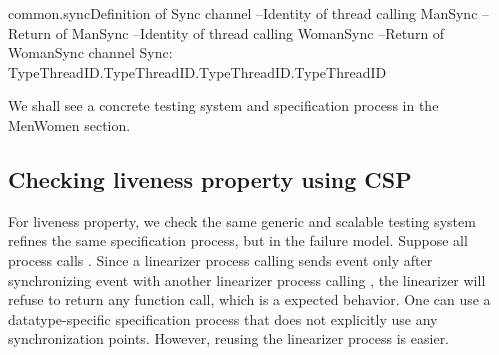 \documentclass{article}
\begin{document}
\begin{cspinline}{common.sync}{Definition of Sync channel}
--Identity of thread calling ManSync
--Return of ManSync
--Identity of thread calling WomanSync
--Return of WomanSync
channel Sync: TypeThreadID.TypeThreadID.TypeThreadID.TypeThreadID
\end{cspinline}
  
We shall see a concrete testing system and specification process in the MenWomen section. 

\subsection{Checking liveness property using CSP}
For liveness property, we check the same generic and scalable testing system refines the same specification process, but in the failure model. Suppose all process calls . Since a linearizer process calling  sends  event only after synchronizing  event with another linearizer process calling , the linearizer will refuse to return any function call, which is a expected behavior. One can use a datatype-specific specification process that does not explicitly use any synchronization points. However, reusing the linearizer process is easier. 
\end{document}
